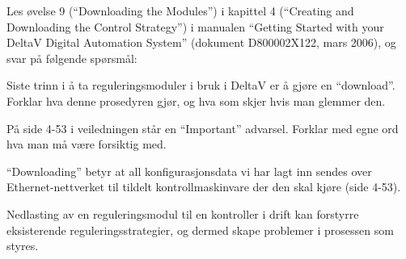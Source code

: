 

Les øvelse 9 (``Downloading the Modules'') i kapittel 4 (``Creating and Downloading the Control Strategy'') i manualen ``Getting Started with your DeltaV Digital Automation System'' (dokument D800002X122, mars 2006), og svar på følgende spørsmål:

\vskip 10pt

Siste trinn i å ta reguleringsmoduler i bruk i DeltaV er å gjøre en ``download''. Forklar hva denne prosedyren gjør, og hva som skjer hvis man glemmer den.

\vskip 10pt

På side 4-53 i veiledningen står en ``Important'' advarsel. Forklar med egne ord hva man må være forsiktig med.














``Downloading'' betyr at all konfigurasjonsdata vi har lagt inn sendes over Ethernet-nettverket til tildelt kontrollmaskinvare der den skal kjøre (side 4-53).

\vskip 10pt

Nedlasting av en reguleringsmodul til en kontroller i drift kan forstyrre eksisterende reguleringsstrategier, og dermed skape problemer i prosessen som styres.


